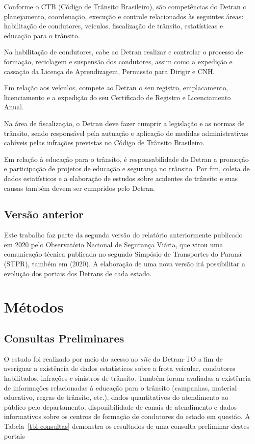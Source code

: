 \documentclass[
  a4paper,
]{article}
\begin{document}
Conforme o CTB (Código de Trânsito Brasileiro), são competências do
Detran o planejamento, coordenação, execução e controle relacionados às
seguintes áreas: habilitação de condutores, veículos, fiscalização de
trânsito, estatísticas e educação para o trânsito.

Na habilitação de condutores, cabe ao Detran realizar e controlar o
processo de formação, reciclagem e suspensão dos condutores, assim como
a expedição e cassação da Licença de Aprendizagem, Permissão para
Dirigir e CNH.

Em relação aos veículos, compete ao Detran o seu registro, emplacamento,
licenciamento e a expedição do seu Certificado de Registro e
Licenciamento Anual.

Na área de fiscalização, o Detran deve fazer cumprir a legislação e as
normas de trânsito, sendo responsável pela autuação e aplicação de
medidas administrativas cabíveis pelas infrações previstas no Código de
Trânsito Brasileiro.

Em relação à educação para o trânsito, é responsabilidade do Detran a
promoção e participação de projetos de educação e segurança no trânsito.
Por fim, coleta de dados estatísticos e a elaboração de estudos sobre
acidentes de trânsito e suas causas também devem ser cumpridos pelo
Detran.

\subsection{Versão anterior}\label{versuxe3o-anterior}

Este trabalho faz parte da segunda versão do relatório anteriormente
publicado em 2020 pelo Observatório Nacional de Segurança Viária, que
virou uma comunicação técnica publicada no segundo Simpósio de
Transportes do Paraná (STPR), também em (2020). A elaboração de uma nova
versão irá possibilitar a evolução dos portais dos Detrans de cada
estado.

\section{Métodos}\label{sec-metodos}

\subsection{Consultas Preliminares}\label{consultas-preliminares}

O estudo foi realizado por meio do acesso ao \emph{site} do Detran-TO a
fim de averiguar a existência de dados estatísticos sobre a frota
veicular, condutores habilitados, infrações e sinistros de trânsito.
Também foram avaliadas a existência de informações relacionadas à
educação para o trânsito (campanhas, material educativo, regras de
trânsito, etc.), dados quantitativos do atendimento ao público pelo
departamento, disponibilidade de canais de atendimento e dados
informativos sobre os centros de formação de condutores do estado em
questão. A Tabela~\ref{tbl-consultas} demonstra os resultados de uma
consulta preliminar destes portais
\end{document}
